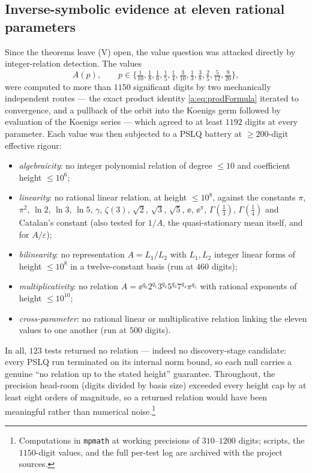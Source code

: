\subsection{Inverse-symbolic evidence at eleven rational parameters}
\label{a:sec:pslq}

Since the theorems leave (V) open, the value question was attacked directly by
integer-relation detection. The values
\begin{equation*}
A(p),\qquad p\in\bigl\{\tfrac1{10},\tfrac18,\tfrac16,\tfrac15,\tfrac14,\tfrac3{10},
\tfrac13,\tfrac38,\tfrac25,\tfrac5{12},\tfrac9{20}\bigr\},
\end{equation*}
were computed to more than $1150$ significant digits by two mechanically
independent routes --- the exact product identity \cref{a:eq:prodFormula} iterated
to convergence, and a pullback of the orbit into the Koenigs germ followed by
evaluation of the Koenigs series --- which agreed to at least $1192$ digits at
every parameter. Each value was then subjected to a PSLQ battery at $\ge200$-digit
effective rigour:
\begin{itemize}
\item \emph{algebraicity}: no integer polynomial relation of degree $\le10$ and
coefficient height $\le10^{6}$;
\item \emph{linearity}: no rational linear relation, at height $\le10^{8}$,
against the constants $\pi$, $\pi^{2}$, $\ln2$, $\ln3$, $\ln5$, $\gamma$,
$\zeta(3)$, $\sqrt2$, $\sqrt3$, $\sqrt5$, $\ee$, $\ee^{\pi}$,
$\Gamma(\tfrac13)$, $\Gamma(\tfrac14)$ and Catalan's constant (also tested for
$1/A$, the quasi-stationary mean itself, and for $A/\varepsilon$);
\item \emph{bilinearity}: no representation $A=L_1/L_2$ with $L_1,L_2$ integer
linear forms of height $\le10^{8}$ in a twelve-constant basis (run at $460$
digits);
\item \emph{multiplicativity}: no relation
$A=\ee^{q_0}2^{q_1}3^{q_2}5^{q_3}7^{q_4}\pi^{q_5}$ with rational exponents of
height $\le10^{10}$;
\item \emph{cross-parameter}: no rational linear or multiplicative relation
linking the eleven values to one another (run at $500$ digits).
\end{itemize}
In all, $123$ tests returned no relation --- indeed no discovery-stage candidate:
every PSLQ run terminated on its internal norm bound, so each null carries a
genuine ``no relation up to the stated height'' guarantee. Throughout, the
precision head-room (digits divided by basis size) exceeded every height cap by at
least eight orders of magnitude, so a returned relation would have been meaningful
rather than numerical noise.\footnote{Computations in \texttt{mpmath} at working
precisions of $310$--$1200$ digits; scripts, the $1150$-digit values, and the full
per-test log are archived with the project sources.}

